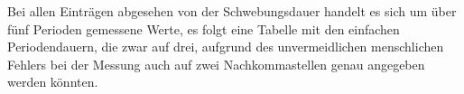 

Bei allen Einträgen abgesehen von der Schwebungsdauer handelt es sich um über fünf Perioden gemessene Werte, es folgt eine Tabelle mit den einfachen Periodendauern, die zwar auf drei,
aufgrund des unvermeidlichen menschlichen Fehlers bei der Messung auch auf zwei Nachkommastellen genau angegeben werden könnten. 
\newpage

